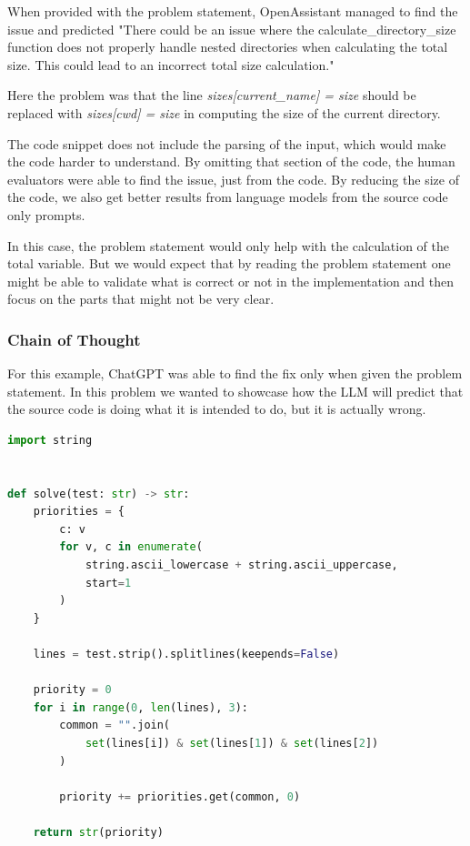 \documentclass[12pt,a4paper]{report}
\begin{document}
When provided with the problem statement, OpenAssistant managed to find the issue and predicted "There could be an issue where the calculate\_directory\_size function does not properly handle nested directories when calculating the total size. This could lead to an incorrect total size calculation."

Here the problem was that the line \textit{sizes[current\_name] = size} should be replaced with \textit{sizes[cwd] = size} in computing the size of the current directory.

The code snippet does not include the parsing of the input, which would make the code harder to understand. By omitting that section of the code, the human evaluators were able to find the issue, just from the code. By reducing the size of the code, we also get better results from language models from the source code only prompts.

In this case, the problem statement would only help with the calculation of the total variable. But we would expect that by reading the problem statement one might be able to validate what is correct or not in the implementation and then focus on the parts that might not be very clear.

\subsubsection{Chain of Thought}

For this example, ChatGPT was able to find the fix only when given the problem statement. In this problem we wanted to showcase how the LLM will predict that the source code is doing what it is intended to do, but it is actually wrong.

\begin{lstlisting}[language=Python]
import string


def solve(test: str) -> str:
    priorities = {
        c: v
        for v, c in enumerate(
            string.ascii_lowercase + string.ascii_uppercase, 
            start=1
        )
    }

    lines = test.strip().splitlines(keepends=False)

    priority = 0
    for i in range(0, len(lines), 3):
        common = "".join(
            set(lines[i]) & set(lines[1]) & set(lines[2])
        )

        priority += priorities.get(common, 0)

    return str(priority)
\end{lstlisting}
\end{document}
